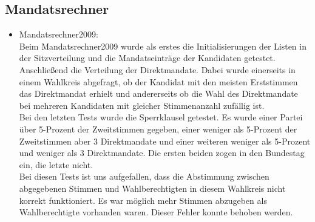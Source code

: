 \documentclass[12pt,a4paper,titlepage]{article}
\begin{document}
\subsection{Mandatsrechner}
\begin{itemize}
\item Mandatsrechner2009:\\
Beim Mandatsrechner2009 wurde als erstes die Initialisierungen der Listen in der Sitzverteilung und die Mandatseinträge der Kandidaten getestet.\\
Anschließend die Verteilung der Direktmandate. Dabei wurde einerseits in einem Wahlkreis abgefragt, ob der Kandidat mit den meisten Erststimmen das Direktmandat erhielt und andererseits ob die Wahl des Direktmandate bei mehreren Kandidaten mit gleicher Stimmenanzahl zufällig ist.\\
Bei den letzten Tests wurde die Sperrklausel getestet. Es wurde einer Partei über 5-Prozent der Zweitstimmen gegeben, einer  weniger als 5-Prozent der Zweitstimmen aber 3 Direktmandate und einer weiteren weniger als 5-Prozent und weniger als 3 Direktmandate. Die ersten beiden zogen in den Bundestag ein, die letzte nicht. \\
Bei diesen Tests ist uns aufgefallen, dass die Abstimmung zwischen abgegebenen Stimmen und Wahlberechtigten in diesem Wahlkreis nicht korrekt funktioniert. Es war möglich mehr  Stimmen abzugeben als Wahlberechtigte vorhanden waren. Dieser Fehler konnte behoben werden.\\


\end{itemize}
\end{document}

